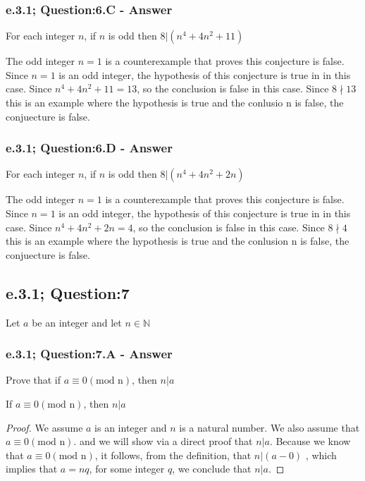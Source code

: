 \subsubsection*{e.3.1; Question:6.C - Answer}
For each integer $n$, if $n$ is odd then $8 | (n^4 + 4n^2 + 11)$

The odd integer $n=1$ is a counterexample that proves this conjecture is false. Since $n=1$ is an odd integer, the hypothesis of this conjecture is true in in this case. Since $n^4 + 4n^2 + 11 = 13$, so the conclusion is false in this case. Since $8 \nmid 13$ this is an example where the hypothesis is true and the conlusio n is false, the conjuecture is false.


\subsubsection*{e.3.1; Question:6.D - Answer}
For each integer $n$, if $n$ is odd then $8 | (n^4 + 4n^2 + 2n)$

The odd integer $n=1$ is a counterexample that proves this conjecture is false. Since $n=1$ is an odd integer, the hypothesis of this conjecture is true in in this case. Since $n^4 + 4n^2 + 2n = 4$, so the conclusion is false in this case. Since $8 \nmid 4$ this is an example where the hypothesis is true and the conlusion n is false, the conjuecture is false.



\newpage
\subsection{e.3.1; Question:7}
Let $a$ be an integer and let  $n \in \mathbb{N}$


\subsubsection*{e.3.1; Question:7.A - Answer}
Prove that if $a \equiv 0 (\text{mod n})$, then $n|a$

\begin{tcolorbox}
	\begin{theorem}
		If $a \equiv 0 (\text{mod n})$, then $n | a$
	\end{theorem}
\end{tcolorbox}

\begin{proof}
We assume $a$ is an integer and $n$ is a natural number. We also assume that $a \equiv 0 (\text{mod n})$. and we will show via a direct proof  that $n|a$. Because we know that $a \equiv 0 (\text{mod n})$, it follows, from the definition, that   $n | (a-0)$ , which implies that $a = nq$, for some integer $q$, we conclude that $n|a$.
\end{proof}



